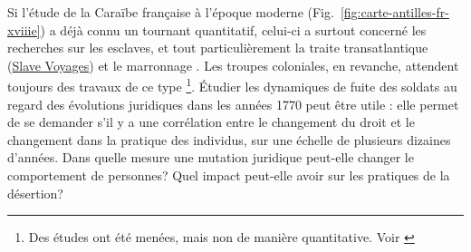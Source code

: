 \documentclass[final, fra]{anthology-ch}     %
\begin{document}
Si l'étude de la Caraïbe française à l'époque moderne (Fig.~\ref{fig:carte-antilles-fr-xviiie}) a déjà connu un tournant quantitatif, celui-ci a surtout concerné les recherches sur les esclaves, et tout particulièrement la traite transatlantique (\href{https://www.slavevoyages.org/}{Slave Voyages}) et le marronnage \cite{EddinsRunaways}. Les troupes coloniales, en revanche, attendent toujours des travaux de ce type \footnote{Des études ont été menées, mais non de manière quantitative. Voir \cite{lesueur_troupes_2009,lesueur_troupes_2015}}. 
Étudier les dynamiques de fuite des soldats au regard des évolutions juridiques dans les années 1770 peut être utile : elle permet de se demander s'il y a une corrélation entre le changement du droit et le changement dans la pratique des individus, sur une échelle de plusieurs dizaines d'années.
Dans quelle mesure une mutation juridique peut-elle changer le comportement de personnes?
Quel impact peut-elle avoir sur les pratiques de la désertion? 
\end{document}
